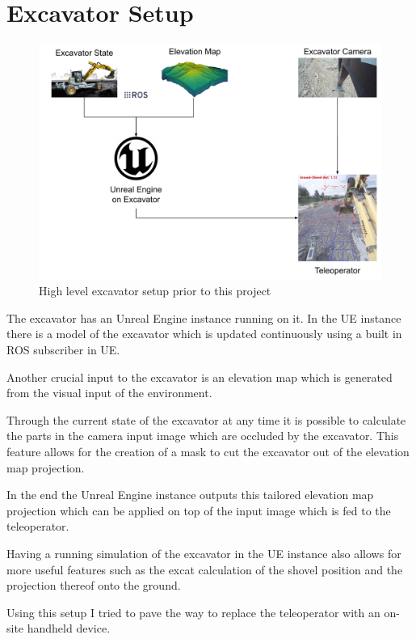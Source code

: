 \chapter*{Excavator Setup}\label{ch:excavatorSetup}

\begin{figure}[ht]
    \centering
    \includegraphics[scale = 0.3]{images/excavator/excavator_setup.png}
    \caption{High level excavator setup prior to this project}
    \label{fig:ex_setup}
\end{figure}

The excavator has an Unreal Engine instance running on it. In the UE instance there is a model of the excavator which is updated continuously using a built in ROS subscriber in UE. 

Another crucial input to the excavator is an elevation map which is generated from the visual input of the environment.

Through the current state of the excavator at any time it is possible to calculate the parts in the camera input image which are occluded by the excavator. This feature allows for the creation of a mask to cut the excavator out of the elevation map projection.

In the end the Unreal Engine instance outputs this tailored elevation map projection which can be applied on top of the input image which is fed to the teleoperator.

Having a running simulation of the excavator in the UE instance also allows for more useful features such as the excat calculation of the shovel position and the projection thereof onto the ground.

Using this setup I tried to pave the way to replace the teleoperator with an on-site handheld device.